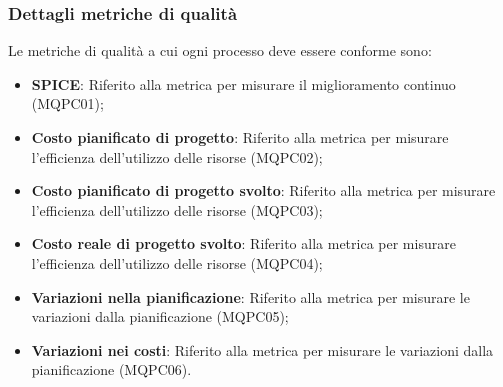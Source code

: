\subsubsection{Dettagli metriche di qualità}
Le metriche di qualità a cui ogni processo deve essere conforme sono:
\begin{itemize}
	\item \textbf{SPICE}: Riferito alla metrica per misurare il miglioramento continuo (MQPC01);
	\item \textbf{Costo pianificato di progetto}: Riferito alla metrica per misurare l'efficienza dell'utilizzo delle risorse (MQPC02);
	\item \textbf{Costo pianificato di progetto svolto}: Riferito alla metrica per misurare l'efficienza dell'utilizzo delle risorse (MQPC03);
	\item \textbf{Costo reale di progetto svolto}: Riferito alla metrica per misurare l'efficienza dell'utilizzo delle risorse (MQPC04);
	\item \textbf{Variazioni nella pianificazione}: Riferito alla metrica per misurare le variazioni dalla pianificazione (MQPC05);
	\item \textbf{Variazioni nei costi}: Riferito alla metrica per misurare le variazioni dalla pianificazione (MQPC06).
\end{itemize}
